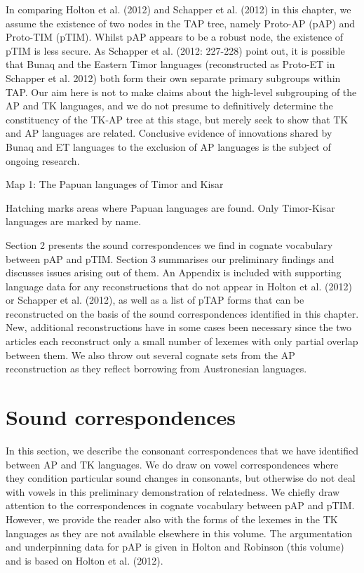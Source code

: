 \documentclass[a4paper]{article}
\begin{document}
In comparing Holton et al. (2012) and Schapper et al. (2012) in this chapter, we assume the existence of two nodes in the TAP tree, namely Proto-AP (pAP) and Proto-TIM (pTIM). Whilst pAP appears to be a robust node, the existence of pTIM is less secure. As Schapper et al. (2012: 227-228) point out, it is possible that Bunaq and the Eastern Timor languages (reconstructed as Proto-ET in Schapper et al. 2012) both form their own separate primary subgroups within TAP. Our aim here is not to make claims about the high-level subgrouping of the AP and TK languages, and we do not presume to definitively determine the constituency of the TK-AP tree at this stage, but merely seek to show that TK and AP languages are related. Conclusive evidence of innovations shared by Bunaq and ET languages to the exclusion of AP languages is the subject of ongoing research. 

{\centering
Map 1: The Papuan languages of Timor and Kisar {\dag}
\par}

{\dag} Hatching marks areas where Papuan languages are found. Only Timor-Kisar languages are marked by name.

Section 2 presents the sound correspondences we find in cognate vocabulary between pAP and pTIM. Section 3 summarises our preliminary findings and discusses issues arising out of them. An Appendix is included with supporting language data for any reconstructions that do not appear in Holton et al. (2012) or Schapper et al. (2012), as well as a list of pTAP forms that can be reconstructed on the basis of the sound correspondences identified in this chapter. New, additional reconstructions have in some cases been necessary since the two articles each reconstruct only a small number of lexemes with only partial overlap between them. We also throw out several cognate sets from the AP reconstruction as they reflect borrowing from Austronesian languages. 

\section[Sound correspondences]{Sound correspondences}
In this section, we describe the consonant correspondences that we have identified between AP and TK languages. We do draw on vowel correspondences where they condition particular sound changes in consonants, but otherwise do not deal with vowels in this preliminary demonstration of relatedness. We chiefly draw attention to the correspondences in cognate vocabulary between pAP and pTIM. However, we provide the reader also with the forms of the lexemes in the TK languages as they are not available elsewhere in this volume. The argumentation and underpinning data for pAP is given in Holton and Robinson (this volume) and is based on Holton et al. (2012).
\end{document}
